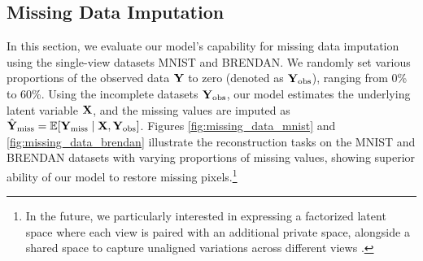 \subsection{Missing Data Imputation}
\label{app:miss_data}


In this section, we evaluate our model's capability for missing data imputation using the single-view datasets MNIST and BRENDAN. We randomly set various proportions of the observed data \({\mathbf Y}\) to zero (denoted as \({\mathbf Y}_{\text{obs}}\)), ranging from 0\% to 60\%. Using the incomplete datasets \({\mathbf Y}_{\text{obs}}\), our model estimates the underlying latent variable \({\mathbf X}\), and the missing values are imputed as \(\hat{{\mathbf Y}}_{\text{miss}} = \mathbb{E}[{\mathbf Y}_{\text{miss}} \mid {\mathbf X}, {\mathbf Y}_{\text{obs}}]\). Figures \ref{fig:missing_data_mnist} and \ref{fig:missing_data_brendan} illustrate the reconstruction tasks on the MNIST and BRENDAN datasets with varying proportions of missing values, showing superior ability of our model to restore missing pixels.\footnote{In the future, we particularly interested in expressing a factorized latent space where each view is paired with an additional private space, alongside a shared space to capture unaligned variations across different views \citep{damianou2012manifold, damianou2021multi}. } 


